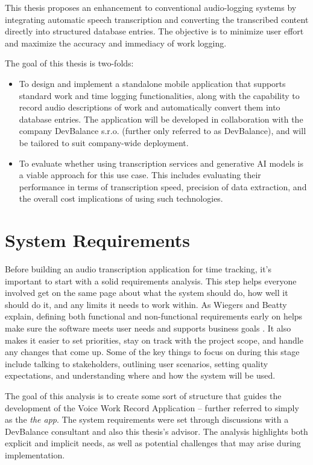 \documentclass[
  digital,     %
  oneside,     %
  nosansbold,  %
  nocolorbold, %
  lof,         %
  lot,         %
]{fithesis4}
\begin{document}
This thesis proposes an enhancement to conventional audio-logging systems by integrating automatic speech transcription and converting the transcribed content directly into structured database entries. The objective is to minimize user effort and maximize the accuracy and immediacy of work logging.

The goal of this thesis is two-folds:
\begin{itemize}
    \item To design and implement a standalone mobile application that supports standard work and time logging functionalities, along with the capability to record audio descriptions of work and automatically convert them into database entries. The application will be developed in collaboration with the company DevBalance s.r.o. (further only referred to as DevBalance), and will be tailored to suit company-wide deployment.
    \item To evaluate whether using transcription services and generative \gls{AI} models is a viable approach for this use case. This includes evaluating their performance in terms of transcription speed, precision of data extraction, and the overall cost implications of using such technologies.
\end{itemize}

\chapter{System Requirements}

Before building an audio transcription application for time tracking, it’s important to start with a solid requirements analysis. This step helps everyone involved get on the same page about what the system should do, how well it should do it, and any limits it needs to work within. As Wiegers and Beatty explain, defining both functional and non-functional requirements early on helps make sure the software meets user needs and supports business goals \cite{wiegers13}. It also makes it easier to set priorities, stay on track with the project scope, and handle any changes that come up. Some of the key things to focus on during this stage include talking to stakeholders, outlining user scenarios, setting quality expectations, and understanding where and how the system will be used.

The goal of this analysis is to create some sort of structure that guides the development of the Voice Work Record Application – further referred to simply as the \textit{the app}. The system requirements were set through discussions with a DevBalance consultant and also this thesis's advisor. The analysis highlights both explicit and implicit needs, as well as potential challenges that may arise during implementation.
\end{document}
